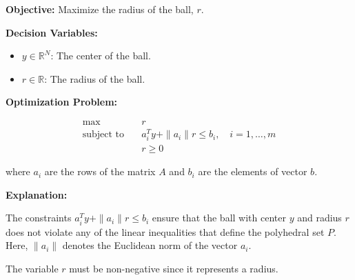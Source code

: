 \documentclass{article}
\begin{document}
\textbf{Objective:} Maximize the radius of the ball, \( r \).

\textbf{Decision Variables:}
\begin{itemize}
    \item \( y \in \mathbb{R}^N \): The center of the ball.
    \item \( r \in \mathbb{R} \): The radius of the ball.
\end{itemize}

\textbf{Optimization Problem:}

\begin{align*}
    \max \quad & r \\
    \text{subject to} \quad & a_i^T y + \| a_i \| r \leq b_i, \quad i = 1, \ldots, m \\
    & r \geq 0
\end{align*}

where \( a_i \) are the rows of the matrix \( A \) and \( b_i \) are the elements of vector \( b \).

\textbf{Explanation:}

The constraints \( a_i^T y + \| a_i \| r \leq b_i \) ensure that the ball with center \( y \) and radius \( r \) does not violate any of the linear inequalities that define the polyhedral set \( P \). Here, \( \| a_i \| \) denotes the Euclidean norm of the vector \( a_i \).

The variable \( r \) must be non-negative since it represents a radius.
\end{document}
